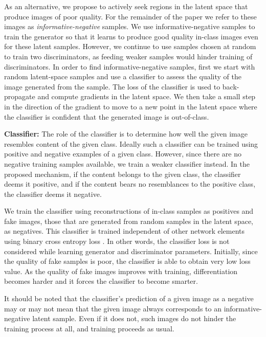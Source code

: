 \documentclass[10pt,twocolumn,letterpaper]{article}
\begin{document}
 



As an alternative, we propose to actively seek regions in the latent space that produce images of poor quality. For the remainder of the paper we refer to these images  as \textit{informative-negative} samples. We use informative-negative samples to train the generator so that it learns to produce good quality in-class images even for these latent samples. However, we continue to use samples chosen at random to train two discriminators, as feeding weaker samples would hinder training of discriminators. In order to find informative-negative samples, first we start with random latent-space samples and use a classifier to assess the quality of the image generated from the sample. The loss of the classifier is used to back-propagate and compute gradients in the latent space. We then take a small step in the direction of the gradient to move to a new point in the latent space where the classifier is confident that the generated image is out-of-class. 

\noindent\textbf{Classifier:} The role of the classifier is to determine how well the given image resembles content of the given class. Ideally such a classifier can be trained using positive and negative examples of a given class. However, since there are no negative training samples available, we train a weaker classifier instead. In the proposed mechanism, if the content belongs to the given class, the classifier deems it positive, and if the content bears no resemblances to the positive class, the classifier deems it negative.

We train the classifier using reconstructions of in-class samples as positives and fake images, those that are generated from random samples in the latent space, as negatives. This classifier is trained independent of other network elements using binary cross entropy loss . In other words, the classifier loss is not considered while learning generator and discriminator parameters. Initially, since the quality of fake samples is poor, the classifier is able to obtain very low loss value. As the quality of fake images improves with training, differentiation becomes harder and it forces the classifier to become smarter.  

It should be noted that the classifier's prediction of a given image as a negative may or may not mean that the given image always corresponds to an informative-negative latent sample. Even if it does not, such images do not hinder the training process at all, and training proceeds as usual.
\end{document}
